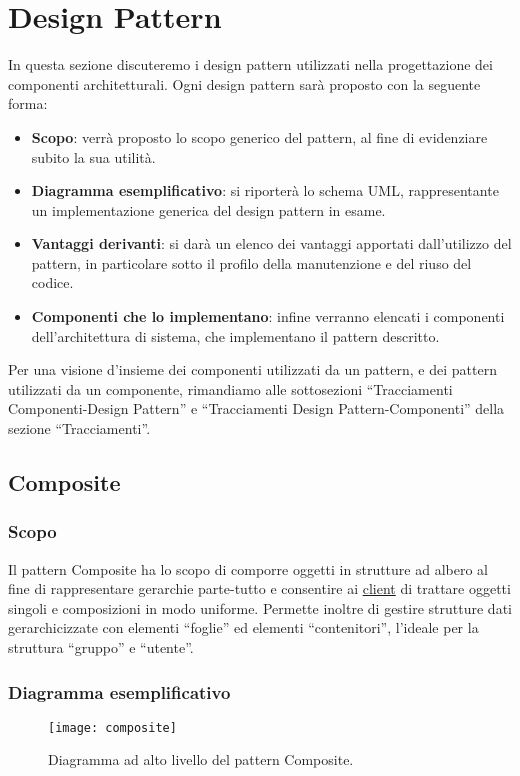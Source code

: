 \section{Design Pattern}
In questa sezione discuteremo i design pattern utilizzati nella progettazione dei componenti architetturali. Ogni design pattern sarà proposto con la seguente forma:
\begin{itemize}
	\item \textbf{Scopo}: verrà proposto lo scopo generico del pattern, al fine di evidenziare subito la sua utilità.
	\item \textbf{Diagramma esemplificativo}: si riporterà lo schema UML, rappresentante un implementazione generica del design pattern in esame.
	\item \textbf{Vantaggi derivanti}: si darà un elenco dei vantaggi apportati dall'utilizzo del pattern, in particolare sotto il profilo della manutenzione e del riuso del codice.
	\item \textbf{Componenti che lo implementano}: infine verranno elencati i componenti dell'architettura di sistema, che implementano il pattern descritto.
\end{itemize}

Per una visione d'insieme dei componenti utilizzati da un pattern, e dei pattern utilizzati da un componente, rimandiamo alle sottosezioni ``Tracciamenti Componenti-Design Pattern'' e ``Tracciamenti Design Pattern-Componenti'' della sezione ``Tracciamenti''.

\subsection{Composite}

\subsubsection{Scopo}
Il pattern Composite ha lo scopo di comporre oggetti in strutture ad albero al fine di rappresentare gerarchie parte-tutto e consentire ai \underline{client} di trattare oggetti singoli e composizioni in modo uniforme. Permette inoltre di gestire strutture dati gerarchicizzate con elementi ``foglie'' ed elementi ``contenitori'', l'ideale per la struttura ``gruppo'' e ``utente''.

\subsubsection{Diagramma esemplificativo}
\begin{figure}[h]
\centering
\texttt{[image: composite]}
\caption{Diagramma ad alto livello del pattern Composite.}\label{fig:composite}
\end{figure}

